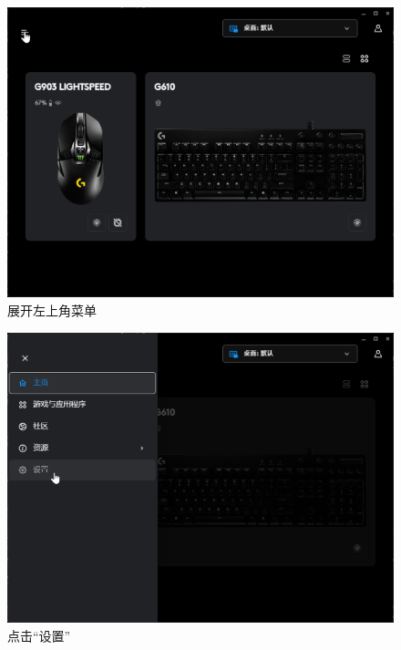 \begin{figure}[H]
    \Centering
    \includegraphics[width=\textwidth]{docs/assets/lghub_menu.png}
    \caption{展开左上角菜单}
\end{figure}

\begin{figure}[H]
    \Centering
    \includegraphics[width=\textwidth]{docs/assets/lghub_setting.png}
    \caption{点击“设置”}
\end{figure}

